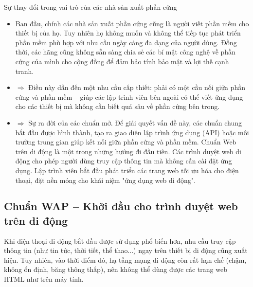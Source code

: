     \begin{flushleft}
      \hspace*{0.8cm}Sự thay đổi trong vai trò của các nhà sản xuất phần cứng
      \setlength{\leftmargini}{1.5cm}
      \begin{itemize}
        \item Ban đầu, chính các nhà sản xuất phần cứng cũng là người viết phần mềm cho thiết bị của họ. Tuy nhiên họ không muốn và không thể tiếp tục phát triển phần mềm phù hợp với nhu cầu ngày càng đa dạng của người dùng. Đồng thời, các hãng cũng không sẵn sàng chia sẻ các bí mật công nghệ về phần cứng của mình cho cộng đồng để đảm bảo tính bảo mật và lợi thế cạnh tranh.
        \item[] $\Rightarrow$ Điều này dẫn đến một nhu cầu cấp thiết: phải có một cầu nối giữa phần cứng và phần mềm – giúp các lập trình viên bên ngoài có thể viết ứng dụng cho các thiết bị mà không cần biết quá sâu về phần cứng bên trong.
        \item[] $\Rightarrow$ Sự ra đời của các chuẩn mở. Để giải quyết vấn đề này, các chuẩn chung bắt đầu được hình thành, tạo ra giao diện lập trình ứng dụng (API) hoặc môi trường trung gian giúp kết nối giữa phần cứng và phần mềm. Chuẩn Web trên di động là một trong những hướng đi đầu tiên. Các trình duyệt web di động cho phép người dùng truy cập thông tin mà không cần cài đặt ứng dụng. Lập trình viên bắt đầu phát triển các trang web tối ưu hóa cho điện thoại, đặt nền móng cho khái niệm "ứng dụng web di động".
      \end{itemize}
  \end{flushleft}

\subsection{Chuẩn WAP – Khởi đầu cho trình duyệt web trên di động}
\renewcommand{\labelitemi}{--}    
    \begin{flushleft}
        \hspace*{0.8cm}Khi điện thoại di động bắt đầu được sử dụng phổ biến hơn, nhu cầu truy cập thông tin (như tin tức, thời tiết, thể thao...) ngay trên thiết bị di động cũng xuất hiện. Tuy nhiên, vào thời điểm đó, hạ tầng mạng di động còn rất hạn chế (chậm, không ổn định, băng thông thấp), nên không thể dùng được các trang web HTML như trên máy tính.
    \end{flushleft}

